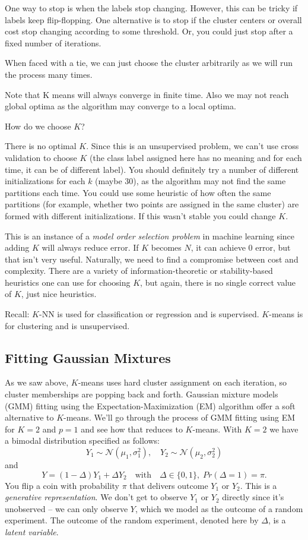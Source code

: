\documentclass[a4paper]{article}
\begin{document}
One way to stop is when the labels stop changing.  
However, this can be tricky if labels keep flip-flopping.  
One alternative is to stop if the cluster centers or overall cost stop changing according to some threshold.  
Or, you could just stop after a fixed number of iterations.

When faced with a tie, we can just choose the cluster arbitrarily as we will run the process many times.

Note that K means will always converge in finite time. Also we may not reach global optima as the algorithm may converge to a local optima. 

How do we choose $K$?  

There is no optimal $K$. Since this is an unsupervised problem, we can't use cross validation to choose $K$ (the class label assigned here has no meaning and for each time, it can be of different label).  
You should definitely try a number of different initializations for each $k$ (maybe 30), as the algorithm may not find the same partitions each time.  
You could use some heuristic of how often the same partitions (for example, whether two points are assigned in the same cluster) are formed with different initializations.  
If this wasn't stable you could change $K$.  

This is an instance of a \emph{model order selection problem} in machine learning since adding $K$ will always reduce error.  
If $K$ becomes $N$, it can achieve $0$ error, but that isn't very useful.  
Naturally, we need to find a compromise between cost and complexity.    
There are a variety of information-theoretic or stability-based heuristics one can use for choosing $K$, but again, there is no single correct value of $K$, just nice heuristics.

Recall: $K$-NN is used for classification or regression and is supervised. $K$-means is for clustering and is unsupervised.

\subsection{Fitting Gaussian Mixtures}
As we saw above, $K$-means uses hard cluster assignment on each iteration, so cluster memberships are popping back and forth.  
Gaussian mixture models (GMM) fitting using the Expectation-Maximization (EM) algorithm offer a soft alternative to $K$-means.  
We'll go through the process of GMM fitting using EM for $K=2$ and $p=1$ and see how that reduces to $K$-means.  
With $K=2$ we have a bimodal distribution specified as follows:
$$
Y_1 \sim \mathcal{N}(\mu_1, \sigma_1^2),\quad Y_2 \sim \mathcal{N}(\mu_2, \sigma_2^2)
$$
and
$$
Y = (1-\Delta)Y_1 + \Delta Y_2 \quad \text{with}\quad \Delta \in \{0,1\}, \; Pr(\Delta=1) = \pi.
$$
You flip a coin with probability $\pi$ that delivers outcome $Y_1$ or $Y_2$.  
This is a \emph{generative representation}.  
We don't get to observe $Y_1$ or $Y_2$ directly since it's unobserved -- we can only observe $Y$, which we model as the outcome of a random experiment. The outcome of the random experiment, denoted here by $\Delta$, is a \emph{latent variable}.
\end{document}
